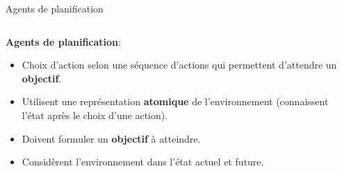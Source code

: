 \documentclass{beamer}
\begin{document}
\begin{frame}[t]{Agents de planification}
  
  \begin{columns}
    \begin{column}{0.5\textwidth}
      
      \alert{\textbf{Agents de planification}}:
    
      \begin{itemize}
        \scriptsize
      \item<2-> Choix d'action selon une \alert{séquence} d'actions qui
        permettent d'attendre un \textbf{objectif}. \\[1cm]
      \item<3->  Utilisent une représentation \textbf{atomique} de
        l'environnement (connaissent l'état après le choix d'une action).\\[1cm]

      \item<4-> Doivent formuler un \alert{\textbf{objectif}} à
        atteindre.\\[1cm]
      \item<5-> Considèrent l'environnement  dans l'état actuel et
        \alert{future}.
      \end{itemize}
    \end{column}
    \begin{column}{0.5\textwidth}
    \end{column}
  \end{columns}
  \vspace*{1cm}
\end{frame}
\end{document}
